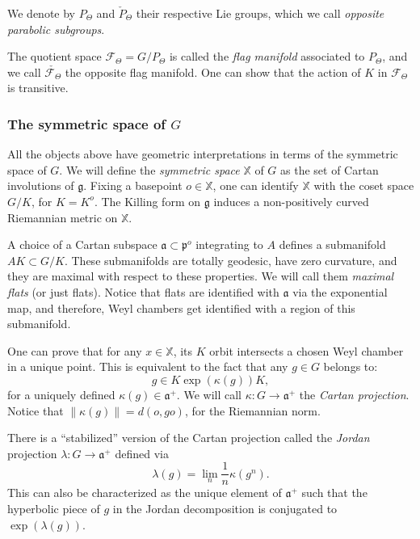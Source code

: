 \documentclass{amsart}
\newcommand{\norm}[1]{\left\lVert#1\right\rVert}
\theoremstyle{remark}
\theoremstyle{definition}
\begin{document}
We denote by $P_\Theta$ and $\check{P}_\Theta$ their respective Lie groups, which we call \emph{opposite parabolic subgroups}.

The quotient space $\mathcal{F}_\Theta = G/P_\Theta$ is called the \emph{flag manifold} associated to $P_\Theta$, and we call $\check{\mathcal{F}_\Theta}$ the opposite flag manifold. One can show that the action of $K$ in $\mathcal{F}_\Theta$ is transitive.   

\subsubsection{The symmetric space of $G$}
\label{subsubsec:symmetric}

All the objects above have geometric interpretations in terms of the symmetric space of $G$.
We will define the \emph{symmetric space} $\mathbb{X}$ of $G$ as the set of Cartan involutions of $\mathfrak{g}$. 
Fixing a basepoint $o \in \mathbb{X}$, one can identify $\mathbb{X}$ with the coset space $G/K$, for $K = K^o$.
The Killing form on $\mathfrak{g}$ induces a non-positively curved Riemannian metric on $\mathbb{X}$.

A choice of a Cartan subspace $\mathfrak{a} \subset \mathfrak{p}^o$ integrating to $A$ defines a submanifold $A K \subset G/K$.
These submanifolds are totally geodesic, have zero curvature, and they are maximal with respect to these properties.
We will call them \emph{maximal flats} (or just flats).
Notice that flats are identified with $\mathfrak{a}$ via the exponential map, and therefore, Weyl chambers get identified with a region of this submanifold.

One can prove that for any $x \in \mathbb{X}$, its $K$ orbit intersects a chosen Weyl chamber in a unique point.
This is equivalent to the fact that any $g \in G$ belongs to:
$$g \in K \exp (\kappa (g)) K,$$
for a uniquely defined $\kappa (g)\in \mathfrak{a}^+$.
We will call $\kappa: G \to \mathfrak{a}^+$ the \emph{Cartan projection}.
Notice that $\norm {\kappa (g)} = d (o,go)$, for the Riemannian norm.

There is a ``stabilized'' version of the Cartan projection called the \emph{Jordan} projection $\lambda :G \to \mathfrak{a}^+$ defined via
$$\lambda (g) = \lim_n \frac{1}{n} \kappa (g^n).$$
This can also be characterized as the unique element of $\mathfrak{a}^+$ such that the hyperbolic piece of $g$ in the Jordan decomposition is conjugated to $\exp(\lambda (g))$.
\end{document}
